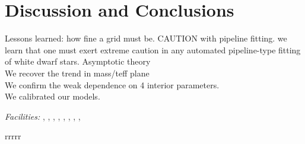 \documentclass[12pt,preprint]{aastex}
\begin{document}
\section{Discussion and Conclusions}
\label{discussion}

Lessons learned: how fine a grid must be. CAUTION with pipeline fitting. we learn that one must 
exert extreme caution in any automated pipeline-type fitting of white dwarf stars.
Asymptotic theory \\
We recover the trend in mass/teff plane \\
We confirm the weak dependence on 4 interior parameters. \\
We calibrated our models.




\acknowledgments


{\it Facilities:} , ,
, 
\facility{}, , ,
, , 






\clearpage

\begin{deluxetable}{rrrrr}
\tabletypesize{\small}
\tablewidth{0pc}
\tablecaption{}
\startdata

\enddata
\end{deluxetable}

\clearpage


\clearpage

\clearpage
\clearpage
\clearpage



\end{document}
